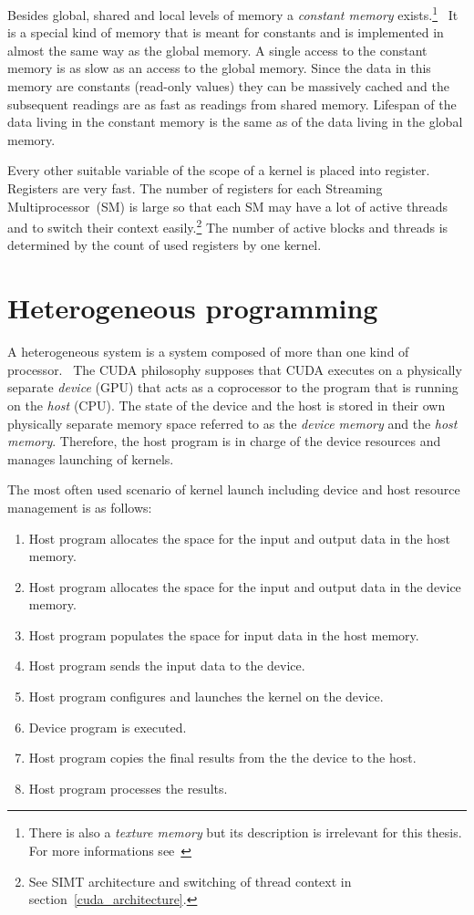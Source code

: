 \documentclass[12pt,oneside]{fithesis2}
\begin{document}
Besides global, shared and local levels of memory a \emph{constant memory} exists.\footnote{There is also a \emph{texture memory} but its description is irrelevant for this thesis. For more informations see~\cite{cuda_guide}}~\cite{cuda_guide} It is a special kind of memory that is meant for constants and is implemented in almost the same way as the global memory. A single access to the constant memory is as slow as an access to the global memory. Since the data in this memory are constants (read-only values) they can be massively cached and the subsequent readings are as fast as readings from shared memory. Lifespan of the data living in the constant memory is the same as of the data living in the global memory.

Every other suitable variable of the scope of a kernel is placed into register. Registers are very fast. The number of registers for each Streaming Multiprocessor~(SM) is large so that each SM may have a lot of active threads and to switch their context easily.\footnote{See SIMT architecture and switching of thread context in section~\ref{cuda_architecture}.} The number of active blocks and threads is determined by the count of used registers by one kernel.

\section{Heterogeneous programming}
\label{heterogeneous_programming}

A heterogeneous system is a system composed of more than one kind of processor.~\cite{professional_cuda} The CUDA philosophy supposes that CUDA executes on a physically separate \emph{device} (GPU) that acts as a coprocessor to the program that is running on the \emph{host} (CPU). The state of the device and the host is stored in their own physically separate memory space referred to as the \emph{device memory} and the \emph{host memory}. Therefore, the host program is in charge of the device resources and manages launching of kernels.~\cite{cuda_guide}

The most often used scenario of kernel launch including device and host resource management is as follows:
\begin{enumerate}[noitemsep]
	\item Host program allocates the space for the input and output data in the host memory.
	\item Host program allocates the space for the input and output data in the device memory.
	\item Host program populates the space for input data in the host memory.
	\item Host program sends the input data to the device.
	\item Host program configures and launches the kernel on the device.
	\item Device program is executed.
	\item Host program copies the final results from the the device to the host.
	\item Host program processes the results. 
\end{enumerate}
\end{document}
